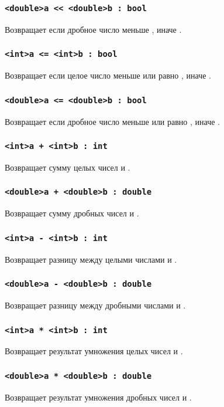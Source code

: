 \documentclass[a4paper, 14pt]{extarticle}
\begin{document}
\subsubsection{\lstinline`<double>a << <double>b : bool`}
Возвращает \true если дробное число  меньше , иначе \false.

\subsubsection{\lstinline`<int>a <= <int>b : bool`}
Возвращает \true если целое число  меньше или равно , иначе \false.

\subsubsection{\lstinline`<double>a <= <double>b : bool`}
Возвращает \true если дробное число  меньше или равно , иначе \false.


\subsubsection{\lstinline`<int>a + <int>b : int`}
Возвращает сумму целых чисел  и .

\subsubsection{\lstinline`<double>a + <double>b : double`}
Возвращает сумму дробных чисел  и .

\subsubsection{\lstinline`<int>a - <int>b : int`}
Возвращает разницу между целыми числами  и .

\subsubsection{\lstinline`<double>a - <double>b : double`}
Возвращает разницу между дробными числами  и .

\subsubsection{\lstinline`<int>a * <int>b : int`}
Возвращает результат умножения целых чисел  и .

\subsubsection{\lstinline`<double>a * <double>b : double`}
Возвращает результат умножения дробных чисел  и .
\end{document}
